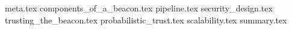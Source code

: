 {meta.tex}
{components_of_a_beacon.tex}
{pipeline.tex}
{security_design.tex}
{trusting_the_beacon.tex}
{probabilistic_trust.tex}
{scalability.tex}
{summary.tex}

